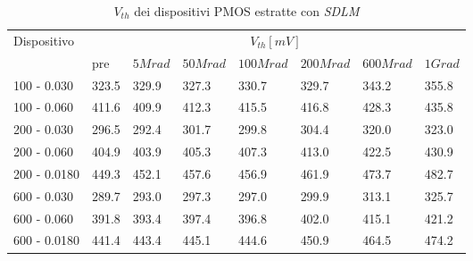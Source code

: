 \documentclass[
	a4paper,
	cleardoublepage=empty,
	headings=twolinechapter,
	numbers=autoenddot,
]{scrbook}
\begin{document}
\begin{table}[H]
  \renewcommand{\arraystretch}{1.3}
  \begin{tabular}{m{2.1cm} m{0.8cm} m{1.1cm} m{1.3cm} m{1.5cm} m{1.5cm} m{1.5cm} m{1cm}}
    \toprule
    \multirow{2}{*}{Dispositivo} & \multicolumn{7}{c}{$V_{th} [mV] $}                                                                    \\
    \cmidrule{2-8}
                                 & pre                                & $5Mrad$ & $50Mrad$ & $100Mrad$ & $200Mrad$ & $600Mrad$ & $1Grad$ \\
    \midrule
    100 - 0.030                     & 323.5                              & 329.9   & 327.3    & 330.7     & 329.7     & 343.2     & 355.8   \\
    \hline
    100 - 0.060                     & 411.6                              & 409.9   & 412.3    & 415.5     & 416.8     & 428.3     & 435.8   \\
    \hline
    200 - 0.030                     & 296.5                              & 292.4   & 301.7    & 299.8     & 304.4     & 320.0     & 323.0   \\
    \hline
    200 - 0.060                     & 404.9                              & 403.9   & 405.3    & 407.3     & 413.0     & 422.5     & 430.9   \\
    \hline
    200 - 0.0180                    & 449.3                              & 452.1   & 457.6    & 456.9     & 461.9     & 473.7     & 482.7   \\
    \hline
    600 - 0.030                     & 289.7                              & 293.0   & 297.3    & 297.0     & 299.9     & 313.1     & 325.7   \\
    \hline
    600 - 0.060                     & 391.8                              & 393.4   & 397.4    & 396.8     & 402.0     & 415.1     & 421.2   \\
    \hline
    600 - 0.0180                    & 441.4                              & 443.4   & 445.1    & 444.6     & 450.9     & 464.5     & 474.2   \\
    \bottomrule
  \end{tabular}
  \caption{$V_{th}$ dei dispositivi PMOS estratte con \emph{SDLM}}
  \label{tab:VthSDLMP}
\end{table}
\end{document}
